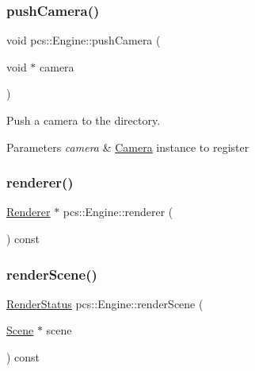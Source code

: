 \subsubsection{\texorpdfstring{push\+Camera()}{pushCamera()}}
{\footnotesize\ttfamily void pcs\+::\+Engine\+::push\+Camera (\begin{DoxyParamCaption}\item[{void $\ast$}]{camera }\end{DoxyParamCaption})\hspace{0.3cm}{\ttfamily [inline]}}



Push a camera to the directory. 


\begin{DoxyParams}{Parameters}
{\em camera} & \hyperlink{classpcs_1_1Camera}{Camera} instance to register \\
\hline
\end{DoxyParams}
\mbox{\label{classpcs_1_1Engine_a232555b38ee9ac84fdf1054de98409e9}} 
\subsubsection{\texorpdfstring{renderer()}{renderer()}}
{\footnotesize\ttfamily \hyperlink{classpcs_1_1Renderer}{Renderer} $\ast$ pcs\+::\+Engine\+::renderer (\begin{DoxyParamCaption}{ }\end{DoxyParamCaption}) const\hspace{0.3cm}{\ttfamily [private]}}

\mbox{\label{classpcs_1_1Engine_ad99225f71f2e1dd2b02bd99ad2c59ab3}} 
\subsubsection{\texorpdfstring{render\+Scene()}{renderScene()}}
{\footnotesize\ttfamily \hyperlink{namespacepcs_a979c2971659f1655c7ebe27752b8a9a0}{Render\+Status} pcs\+::\+Engine\+::render\+Scene (\begin{DoxyParamCaption}\item[{\hyperlink{classpcs_1_1Scene}{Scene} $\ast$}]{scene }\end{DoxyParamCaption}) const}



